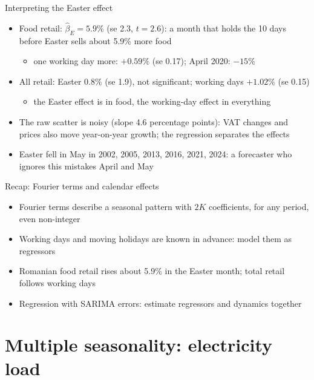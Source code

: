 \begin{frame}{Interpreting the Easter effect}
\itemsize{\footnotesize}
\begin{itemize}
    \item Food retail: $\hat\beta_E = 5.9\%$ (se 2.3, $t = 2.6$): a month that holds the 10 days before Easter sells about 5.9\% more food
    \begin{itemize}
        \item one working day more: $+0.59\%$ (se 0.17); April 2020: $\ensuremath{-}15\%$
    \end{itemize}
    \item All retail: Easter $0.8\%$ (se 1.9), not significant; working days $+1.02\%$ (se 0.15)
    \begin{itemize}
        \item the Easter effect is in food, the working-day effect in everything
    \end{itemize}
    \item The raw scatter is noisy (slope 4.6 percentage points): VAT changes and prices also move year-on-year growth; the regression separates the effects
    \item Easter fell in May in 2002, 2005, 2013, 2016, 2021, 2024: a forecaster who ignores this mistakes April and May
\end{itemize}
\end{frame}

\begin{frame}{Recap: Fourier terms and calendar effects}
\itemsize{\small}
\begin{itemize}
    \item Fourier terms describe a seasonal pattern with $2K$ coefficients, for any period, even non-integer
    \item Working days and moving holidays are known in advance: model them as regressors
    \item Romanian food retail rises about 5.9\% in the Easter month; total retail follows working days
    \item Regression with SARIMA errors: estimate regressors and dynamics together
\end{itemize}
\end{frame}


\section{Multiple seasonality: electricity load}

